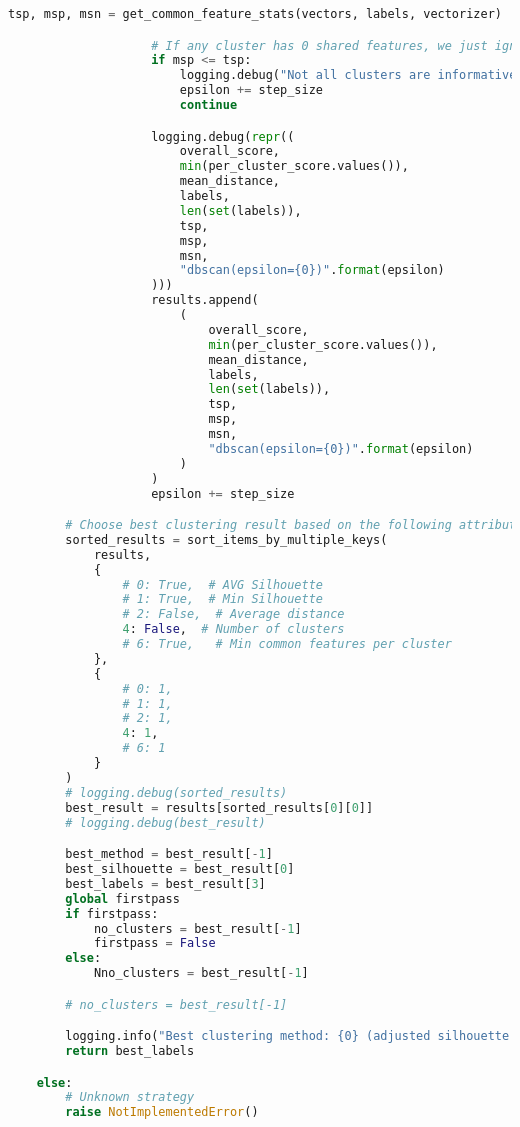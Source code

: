 \begin{lstlisting}[language=python]
                    tsp, msp, msn = get_common_feature_stats(vectors, labels, vectorizer)

                    # If any cluster has 0 shared features, we just ignore the result
                    if msp <= tsp:
                        logging.debug("Not all clusters are informative (a cluster has 0 shared features) ")
                        epsilon += step_size
                        continue

                    logging.debug(repr((
                        overall_score,
                        min(per_cluster_score.values()),
                        mean_distance,
                        labels,
                        len(set(labels)),
                        tsp,
                        msp,
                        msn,
                        "dbscan(epsilon={0})".format(epsilon)
                    )))
                    results.append(
                        (
                            overall_score,
                            min(per_cluster_score.values()),
                            mean_distance,
                            labels,
                            len(set(labels)),
                            tsp,
                            msp,
                            msn,
                            "dbscan(epsilon={0})".format(epsilon)
                        )
                    )
                    epsilon += step_size

        # Choose best clustering result based on the following attributes
        sorted_results = sort_items_by_multiple_keys(
            results,
            {
                # 0: True,  # AVG Silhouette
                # 1: True,  # Min Silhouette
                # 2: False,  # Average distance
                4: False,  # Number of clusters
                # 6: True,   # Min common features per cluster
            },
            {
                # 0: 1,
                # 1: 1,
                # 2: 1,
                4: 1,
                # 6: 1
            }
        )
        # logging.debug(sorted_results)
        best_result = results[sorted_results[0][0]]
        # logging.debug(best_result)

        best_method = best_result[-1]
        best_silhouette = best_result[0]
        best_labels = best_result[3]
        global firstpass
        if firstpass:
            no_clusters = best_result[-1]
            firstpass = False
        else:
            Nno_clusters = best_result[-1]

        # no_clusters = best_result[-1]

        logging.info("Best clustering method: {0} (adjusted silhouette == {1})".format(best_method, best_silhouette))
        return best_labels

    else:
        # Unknown strategy
        raise NotImplementedError()
\end{lstlisting}
